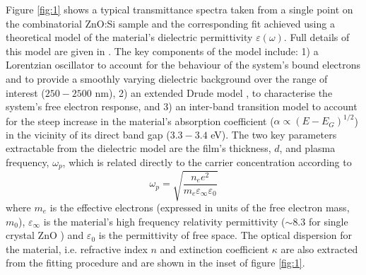 \documentclass[final,5p,times]{elsarticle}
\begin{document}
Figure \ref{fig:1} shows a typical transmittance spectra taken from a single point on the combinatorial ZnO:Si sample and the corresponding fit achieved using a theoretical model of the material's dielectric permittivity $\varepsilon(\omega)$. Full details of this model are given in \cite{Treharne2012}. The key components of the model include: 1) a Lorentzian oscillator to account for the behaviour of the system's bound electrons and to provide a smoothly varying dielectric background over the range of interest ($250-2500$ nm), 2) an extended Drude model \cite{Mergel2002}, to characterise the system's free electron response, and 3) an inter-band transition model to account for the steep increase in the material's absorption coefficient ($\alpha \propto (E-E_G)^{1/2}$) in the vicinity of its direct band gap ($3.3 - 3.4$ eV). The two key parameters extractable from the dielectric model are the film's thickness, $d$, and plasma frequency, $\omega_{p}$, which is related directly to the carrier concentration according to
\begin{equation}
\label{eqn:1}
\omega_p = \sqrt{\frac{n_e e^2}{m_e\varepsilon_{\infty} \varepsilon_0}}
\end{equation}
where $m_e$ is the effective electrons (expressed in units of the free electron mass, $m_0$), $\varepsilon_{\infty}$ is the material's high frequency relativity permittivity  ($\sim 8.3$ for single crystal ZnO \citep{Ashkenov2003}) and $\varepsilon_0$ is the permittivity of free space. The optical dispersion for the material, i.e. refractive index $n$ and extinction coefficient $\kappa$ are also extracted from the fitting procedure and are shown in the inset of figure \ref{fig:1}.
\end{document}

